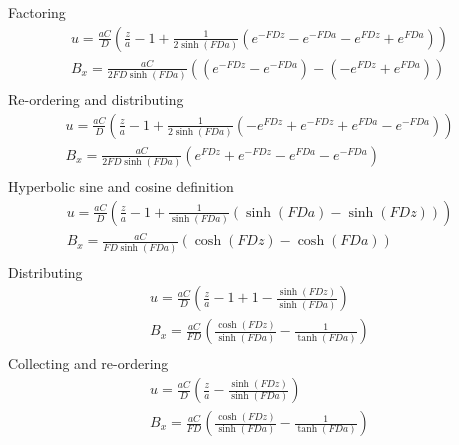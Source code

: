 \documentclass[11pt]{article}
\begin{document}
Factoring
\begin{equation}\begin{aligned}
u   = \frac{aC}{D}  \left( \frac{z}{a} - 1 + \frac{1}{2\sinh(FD a)} \left(   e^{-FD z} - e^{-FD a} - e^{ FD z} + e^{ FD a}\right) \right) \\
B_x = \frac{aC}{2FD\sinh(FD a)} \left(\left(e^{-FD z} - e^{-FD a} \right) - \left( - e^{ FD z} + e^{ FD a} \right) \right) \\
\end{aligned} \end{equation}
Re-ordering and distributing
\begin{equation}\begin{aligned}
u   = \frac{aC}{D}  \left( \frac{z}{a} - 1 + \frac{1}{2\sinh(FD a)} \left( - e^{ FD z} + e^{-FD z} + e^{ FD a} - e^{-FD a} \right) \right) \\
B_x = \frac{aC}{2FD\sinh(FD a)} \left( e^{ FD z} + e^{-FD z}- e^{ FD a} - e^{-FD a} \right) \\
\end{aligned} \end{equation}
Hyperbolic sine and cosine definition
\begin{equation}\begin{aligned}
u   = \frac{aC}{D}  \left( \frac{z}{a} - 1 + \frac{1}{\sinh(FD a)} ( \sinh(FD a) - \sinh(FD z) ) \right) \\
B_x = \frac{aC}{FD\sinh(FD a)} \left( \cosh(FD z) - \cosh(FD a) \right) \\
\end{aligned} \end{equation}
Distributing
\begin{equation}\begin{aligned}
u   = \frac{aC}{D}  \left( \frac{z}{a} - 1 + 1 - \frac{\sinh(FD z)}{\sinh(FD a)} \right) \\
B_x = \frac{aC}{FD} \left( \frac{\cosh(FD z)}{\sinh(FD a)} - \frac{1}{\tanh(FD a)} \right) \\
\end{aligned} \end{equation}
Collecting and re-ordering
\begin{equation}\begin{aligned}
u   = \frac{aC}{D}  \left( \frac{z}{a} - \frac{\sinh(FD z)}{\sinh(FD a)} \right) \\
B_x = \frac{aC}{FD} \left( \frac{\cosh(FD z)}{\sinh(FD a)} - \frac{1}{\tanh(FD a)} \right) \\
\end{aligned} \end{equation}
\end{document}
